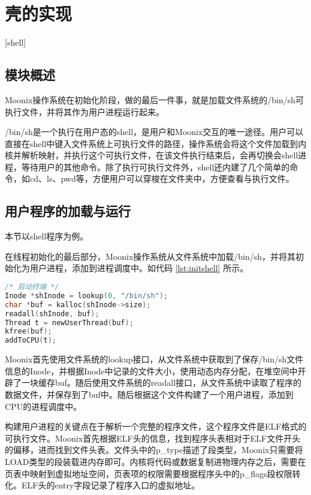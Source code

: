 
\chapter{壳的实现}[shell]
\label{chapter:shell}

\section{模块概述}

Moonix操作系统在初始化阶段，做的最后一件事，就是加载文件系统的/bin/sh可执行文件，并将其作为用户进程运行起来。

/bin/sh是一个执行在用户态的shell，是用户和Moonix交互的唯一途径。用户可以直接在shell中键入文件系统上可执行文件的路径，操作系统会将这个文件加载到内核并解析映射，并执行这个可执行文件，在该文件执行结束后，会再切换会shell进程，等待用户的其他命令。除了执行可执行文件外，shell还内建了几个简单的命令，如cd、ls、pwd等，方便用户可以穿梭在文件夹中，方便查看与执行文件。

\section{用户程序的加载与运行}

本节以shell程序为例。

在线程初始化的最后部分，Moonix操作系统从文件系统中加载/bin/sh，并将其初始化为用户进程，添加到进程调度中。如代码 \ref{lst:initshell} 所示。

\begin{minipage}[c]{0.95\textwidth}
\begin{lstlisting}[language={C}, caption={Moonix加载shell}, label={lst:initshell}]
/* 启动终端 */
Inode *shInode = lookup(0, "/bin/sh");
char *buf = kalloc(shInode->size);
readall(shInode, buf);
Thread t = newUserThread(buf);
kfree(buf);
addToCPU(t);
\end{lstlisting}
\end{minipage}

Moonix首先使用文件系统的lookup接口，从文件系统中获取到了保存/bin/sh文件信息的Inode，并根据Inode中记录的文件大小，使用动态内存分配，在堆空间中开辟了一块缓存buf。随后使用文件系统的readall接口，从文件系统中读取了程序的数据文件，并保存到了buf中。随后根据这个文件构建了一个用户进程，添加到CPU的进程调度中。

构建用户进程的关键点在于解析一个完整的程序文件，这个程序文件是ELF格式的可执行文件。Moonix首先根据ELF头的信息，找到程序头表相对于ELF文件开头的偏移，进而找到文件头表。文件头中的p\_type描述了段类型，Moonix只需要将LOAD类型的段装载进内存即可。内核将代码或数据复制进物理内存之后，需要在页表中映射到虚拟地址空间，页表项的权限需要根据程序头中的p\_flags段权限转化。ELF头的entry字段记录了程序入口的虚拟地址。

